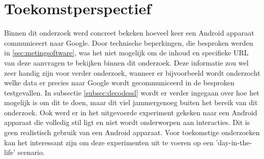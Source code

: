 \section{Toekomstperspectief}
Binnen dit onderzoek werd concreet bekeken hoeveel keer een Android apparaat communiceert naar Google. Door technische beperkingen, die besproken werden in \ref{sec:metingsoftware}, was het niet mogelijk om de inhoud en specifieke URL van deze aanvragen te bekijken binnen dit onderzoek. Deze informatie zou wel zeer handig zijn voor verder onderzoek, wanneer er bijvoorbeeld wordt onderzocht welke data er precies naar Google wordt gecommuniceerd in de besproken testgevallen. In subsectie \ref{subsec:decodessl} wordt er verder ingegaan over hoe het mogelijk is om dit te doen, maar dit viel jammergenoeg buiten het bereik van dit onderzoek. Ook werd er in het uitgevoerde experiment gekeken naar een Android apparaat die volledig stil ligt en niet wordt onderworpen aan interacties. Dit is geen realistisch gebruik van een Android apparaat. Voor toekomstige onderzoeken kan het interessant zijn om deze experimenten uit te voeren op een 'day-in-the-life' scenario.